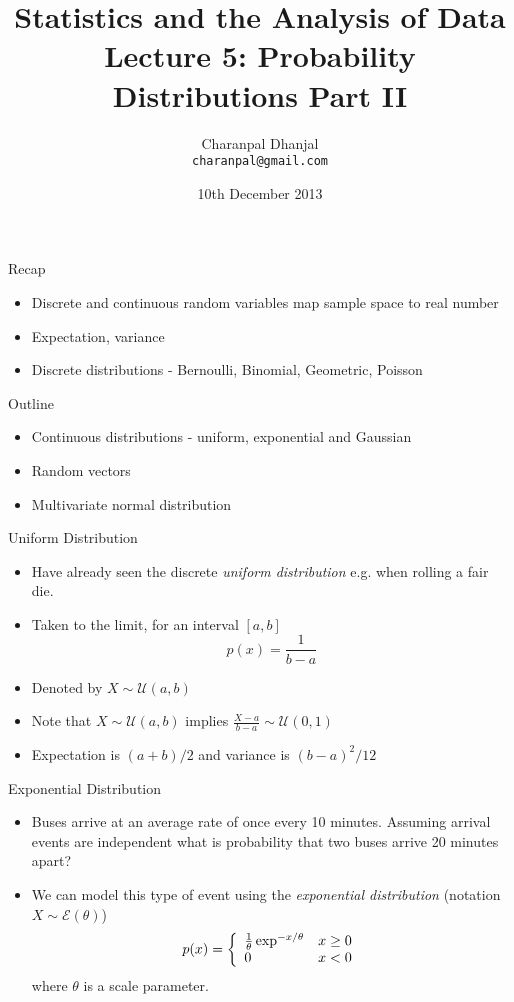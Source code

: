 \documentclass{beamer}
\title{Statistics and the Analysis of Data\\ Lecture 5: Probability Distributions Part II}
\author{Charanpal Dhanjal \\ \texttt{charanpal@gmail.com}}
\institute{\'{E}cole des Ponts}
\date{10th December 2013}
\begin{document}
\frame{\titlepage}


\begin{frame}{Recap}  
\begin{itemize} 
\item Discrete and continuous random variables map sample space to real number 
\item Expectation, variance 
\item Discrete distributions - Bernoulli, Binomial, Geometric, Poisson
\end{itemize}
\end{frame}

\begin{frame}{Outline} 
\begin{itemize} 
 \item Continuous distributions - uniform, exponential and Gaussian
 \item Random vectors 
 \item Multivariate normal distribution 
\end{itemize}
\end{frame}

\begin{frame}{Uniform Distribution}  
 \begin{itemize} 
\item Have already seen the discrete \emph{uniform distribution} e.g. when rolling a fair die. 
\item Taken to the limit, for an interval $[a, b]$ 
\begin{displaymath} 
 p(x) = \frac{1}{b-a}
\end{displaymath}
\item Denoted by $X \sim \mathcal{U}(a, b)$
\item Note that  $X \sim \mathcal{U}(a, b)$ implies $\frac{X - a}{b - a} \sim \mathcal{U}(0, 1)$
\item Expectation is $(a+b)/2$ and variance is $(b-a)^2/12$ 
\end{itemize}
\end{frame}



\begin{frame}{Exponential Distribution} 
\begin{itemize} 
 \item Buses arrive at an average rate of once every 10 minutes. Assuming arrival events are independent what is probability that two buses arrive 20 minutes apart? 
 \item We can model this type of event using the \emph{exponential distribution} (notation $X \sim \mathcal{E}(\theta)$)
 \begin{displaymath}
  p(x) = \left\{ \begin{array}{l l}\frac{1}{\theta}  \exp^{-x/\theta} & x \geq 0 \\ 0 & x < 0 \end{array} \right. 
 \end{displaymath}
  where $\theta$ is a scale parameter. 
\end{itemize}
\end{frame}
\end{document}
